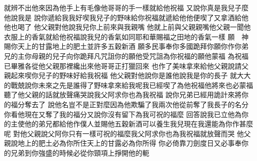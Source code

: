 就辨不出他來\chientien 因為他手上有毛\chientien 像他哥哥的手一樣\chientien 就給他祝福\chuan 
{}又說\chientien 你真是我兒子麼\chientien 他說\chientien 我是\chuan 
{}說\chientien 你遞給我\chientien 我好喫我兒子的野味\chientien 給你祝福\chuan{}就遞給他\chientien 他便喫了\yuentien 又拿酒給他\chientien 他也喝了\chuan 
{}他父親對他說\chientien 我兒\chientien 你上前來與我親嘴\chuan 
{}他就上前與父親親嘴\yuentien 他父親一聞他衣服上的香氣\chientien 就給他祝福\chientien 說\chientien 我兒的香氣如同耶和華賜福之田地的香氣一樣\chuan 
{}願　神賜你天上的甘露\chientien 地上的肥土\chientien 並許多五穀新酒\yuentien 
{}願多民事奉你\chientien 多國跪拜你\yuentien 願你作你弟兄的主\chientien 你母親的兒子向你跪拜\yuentien 凡咒詛你的\chientien 願他受咒詛\yuentien 為你祝福的\chientien 願他蒙福\chuan\Chuan
{}為祝福已畢\chientien 雅各從他父親那裡纔出來\chientien 他哥哥正打獵回來\chuan 
{}也作了美味\chientien 拿來給他父親\chientien 說\chientien 請父親起來\chientien 喫你兒子的野味\chientien 好給我祝福\chuan 
{}他父親對他說\chientien 你是誰\chientien 他說\chientien 我是你的長子\chuan 
{}就大大的戰兢\chientien 說\chientien 你未來之先\chientien 是誰得了野味拿來給我呢\chientien 我已經喫了\chientien 為他祝福\chientien 他將來也必蒙福\chuan 
{}聽了他父親的話\chientien 就放聲痛哭\chientien 說\chientien 我父阿\chientien 求你也為我祝福\chuan 
{}說\chientien 你兄弟已經用詭計來將你的福分奪去了\chuan 
{}說\chientien 他名豈不是正對麼\yuentien 因為他欺騙了我兩次\chientien 他從前奪了我長子的名分\chientien 你看\chientien 他現在又奪了我的福分\chuan{}又說\chientien 你沒有留下為我可祝的福麼\chuan 
{}回答說\chientien 我已立他為你的主\chientien 使他的弟兄都給他作僕人\chientien 並賜他五穀新酒可以養生\chientien 我兒\chientien 現在我還能為你作甚麼呢\chuan 
{}對他父親說\chientien 父阿\chientien 你只有一樣可祝的福麼\chientien 我父阿\chientien 求你也為我祝福\yuentien{}就放聲而哭\chuan 
{}他父親說\chientien 地上的肥土必為你所住\chientien 天上的甘露必為你所得\yuentien 
{}你必倚靠刀劍度日\chientien 又必事奉你的兄弟\chientien 到你強盛的時候\chientien 必從你頸項上掙開他的軛\chuan\Chuan
